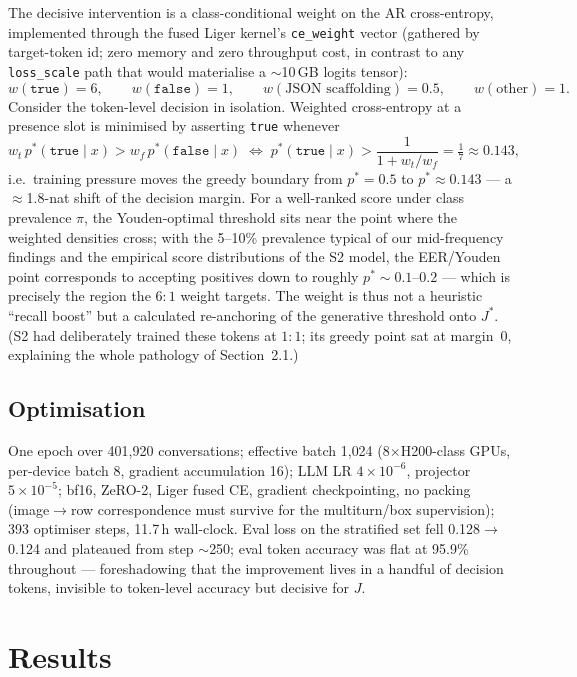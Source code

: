 \documentclass[10pt,a4paper]{article}
\begin{document}
The decisive intervention is a class-conditional weight on the AR cross-entropy,
implemented through the fused Liger kernel's \texttt{ce\_weight} vector (gathered by
target-token id; zero memory and zero throughput cost, in contrast to any
\texttt{loss\_scale} path that would materialise a $\sim$10\,GB logits tensor):
\[
w(\texttt{true})=6,\qquad w(\texttt{false})=1,\qquad w(\text{JSON scaffolding})=0.5,
\qquad w(\text{other})=1 .
\]
Consider the token-level decision in isolation. Weighted cross-entropy at a presence
slot is minimised by asserting \texttt{true} whenever
\[
w_t\, p^{*}(\texttt{true}\mid x) > w_f\, p^{*}(\texttt{false}\mid x)
\;\Longleftrightarrow\;
p^{*}(\texttt{true}\mid x) > \frac{1}{1+w_t/w_f} = \tfrac{1}{7}\approx 0.143,
\]
i.e.\ training pressure moves the greedy boundary from $p^{*}{=}0.5$ to
$p^{*}{\approx}0.143$ --- a $\approx$1.8-nat shift of the decision margin. For a
well-ranked score under class prevalence $\pi$, the Youden-optimal threshold sits near
the point where the weighted densities cross; with the 5--10\% prevalence typical of
our mid-frequency findings and the empirical score distributions of the S2 model, the
EER/Youden point corresponds to accepting positives down to roughly
$p^{*}\!\sim\!0.1$--$0.2$ --- which is precisely the region the $6{:}1$ weight targets.
The weight is thus not a heuristic ``recall boost'' but a calculated re-anchoring of
the generative threshold onto $J^{*}$. (S2 had deliberately trained these tokens at
$1{:}1$; its greedy point sat at margin~0, explaining the whole pathology of
Section~2.1.)

\subsection{Optimisation}

One epoch over 401{,}920 conversations; effective batch 1{,}024 (8$\times$H200-class
GPUs, per-device batch 8, gradient accumulation 16); LLM LR $4\times10^{-6}$, projector
$5\times10^{-5}$; bf16, ZeRO-2, Liger fused CE, gradient checkpointing, no packing
(image$\to$row correspondence must survive for the multiturn/box supervision);
393 optimiser steps, 11.7\,h wall-clock. Eval loss on the stratified set fell
0.128$\to$0.124 and plateaued from step $\sim$250; eval token accuracy was flat at
95.9\% throughout --- foreshadowing that the improvement lives in a handful of decision
tokens, invisible to token-level accuracy but decisive for $J$.

\section{Results}
\end{document}
